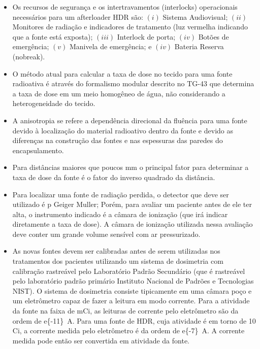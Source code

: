 \documentclass[11pt,a4paper]{article}
\newcounter{exemplo}
\begin{document}
\begin{exemplo}[Braquiterapia]
\begin{itemize}
        \item Os recursos de segurança e os intertravamentos (interlocks) operacionais necessários para um afterloader HDR são: $(i)$ Sistema Audiovisual; $(ii)$ Monitores de radiação e indicadores de tratamento (luz vermelha indicando que a fonte está exposta); $(iii)$ Interlock de porta;  $(iv)$ Botões de emergência; $(v)$ Manivela de emergência; e $(iv)$ Bateria Reserva (nobreak).
        
        \item O método atual para calcular a taxa de dose no tecido para uma fonte radioativa é através do formalismo modular descrito no TG-43 que determina a taxa de dose em um meio homogêneo de água, não considerando a heterogeneidade do tecido.
        
        \item A anisotropia se refere a dependência direcional da fluência para uma fonte devido à localização do material radioativo dentro da fonte e devido as diferenças na construção das fontes e nas espessuras das paredes do encapsulamento.
        
        \item Para distâncias maiores que poucos mm o principal fator para determinar a taxa de dose da fonte é o fator do inverso quadrado da distância.
        
        \item Para localizar uma fonte de radiação perdida, o detector que deve ser utilizado é p Geiger Muller; Porém, para avaliar um paciente antes de ele ter alta, o instrumento indicado é a câmara de ionização (que irá indicar diretamente a taxa de dose). A câmara de ionização utilizada nessa avaliação deve conter um grande volume sensível com ar pressurizado.
        
        \item As novas fontes devem ser calibradas antes de serem utilizadas nos tratamentos dos pacientes utilizando um sistema de dosimetria com calibração rastreável pelo Laboratório Padrão Secundário (que é rastreável pelo laboratório padrão primário Instituto Nacional de Padrões e Tecnologias NIST). O sistema de dosimetria consiste tipicamente em uma câmara poço e um eletrômetro capaz de fazer a leitura em modo corrente. Para a atividade da fonte na faixa de mCi, as leituras de corrente pelo eletrômetro são da ordem de \qty{e{-11}}{A}. Para uma fonte de HDR, cuja atividade é em torno de 10 Ci, a corrente medida pelo eletrômetro é da ordem de \qty{e{-7}}{A}. A corrente medida pode então ser convertida em atividade da fonte.
        

\end{itemize}
\end{exemplo}
\end{document}
